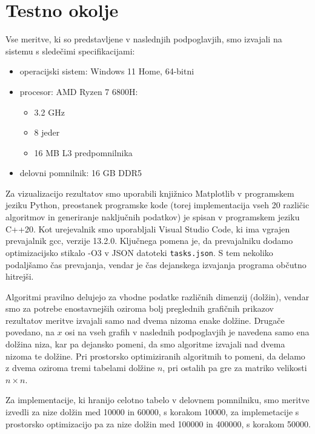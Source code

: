 \documentclass[a4paper,12pt,openright]{book}
\begin{document}
\section{Testno okolje}

Vse meritve, ki so predstavljene v naslednjih podpoglavjih, smo izvajali na sistemu s sledečimi specifikacijami:
\begin{itemize}
    \item operacijski sistem: Windows 11 Home, 64-bitni
    \item procesor: AMD Ryzen 7 6800H:
        \begin{itemize}
            \item 3.2 GHz
            \item 8 jeder
            \item 16 MB L3 predpomnilnika
        \end{itemize}
    \item delovni pomnilnik: 16 GB DDR5
\end{itemize}

Za vizualizacijo rezultatov smo uporabili knjižnico Matplotlib v programskem jeziku Python, preostanek programske kode (torej implementacija vseh 20 različic algoritmov in generiranje naključnih podatkov) je spisan v programskem jeziku C++20. Kot urejevalnik smo uporabljali Visual Studio Code, ki ima vgrajen prevajalnik gcc, verzije 13.2.0. Ključnega pomena je, da prevajalniku dodamo optimizacijsko stikalo -O3 \cite{compilerFlag} v JSON datoteki \texttt{tasks.json}. S tem nekoliko podaljšamo čas prevajanja, vendar je čas dejanskega izvajanja programa občutno hitrejši. 

\bigskip

Algoritmi pravilno delujejo za vhodne podatke različnih dimenzij (dolžin), vendar smo za potrebe enostavnejših oziroma bolj preglednih grafičnih prikazov rezultatov meritve izvajali samo nad dvema nizoma enake dolžine. Drugače povedano, na $x$ osi na vseh grafih v naslednih podpoglavjih je navedena samo ena dolžina niza, kar pa dejansko pomeni, da smo algoritme izvajali nad dvema nizoma te dolžine. Pri prostorsko optimiziranih algoritmih to pomeni, da delamo z dvema oziroma tremi tabelami dolžine $n$, pri ostalih pa gre za matriko velikosti $n \times n$. 

Za implementacije, ki hranijo celotno tabelo v delovnem pomnilniku, smo meritve izvedli za nize dolžin med 10000 in 60000, s korakom 10000, za implemetacije s prostorsko optimizacijo pa za nize dolžin med 100000 in 400000, s korakom 50000. 
\end{document}
